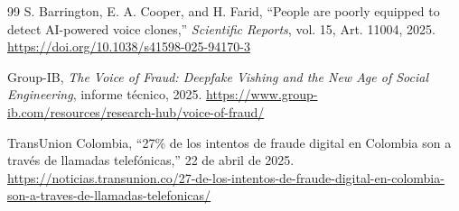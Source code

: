 \documentclass[10pt,twocolumn]{article}
\begin{document}
\begin{thebibliography}{99}
S. Barrington, E. A. Cooper, and H. Farid,
``People are poorly equipped to detect AI-powered voice clones,''
\textit{Scientific Reports},
vol. 15, Art. 11004, 2025.
\url{https://doi.org/10.1038/s41598-025-94170-3}

Group-IB,
\textit{The Voice of Fraud: Deepfake Vishing and the New Age of Social
Engineering},
informe técnico, 2025.
\url{https://www.group-ib.com/resources/research-hub/voice-of-fraud/}

TransUnion Colombia,
``27\% de los intentos de fraude digital en Colombia son a través de llamadas
telefónicas,''
22 de abril de 2025.
\url{https://noticias.transunion.co/27-de-los-intentos-de-fraude-digital-en-colombia-son-a-traves-de-llamadas-telefonicas/}

\end{thebibliography}
\end{document}
